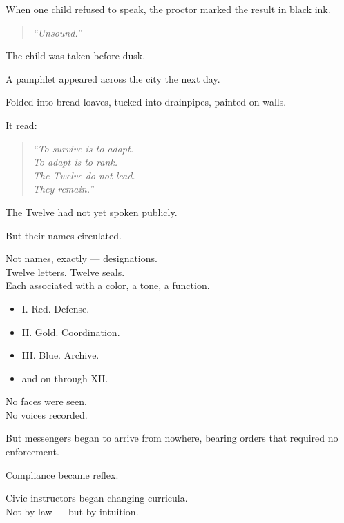\documentclass[9pt]{article}
\begin{document}
When one child refused to speak, the proctor marked the result in black ink.

\begin{quote}
\textit{“Unsound.”}
\end{quote}

The child was taken before dusk.

\vspace{1em}

A pamphlet appeared across the city the next day.

Folded into bread loaves, tucked into drainpipes, painted on walls.

It read:

\begin{quote}
\textit{“To survive is to adapt.}\\
\textit{To adapt is to rank.}\\
\textit{The Twelve do not lead.}\\
\textit{They remain.”}
\end{quote}

\vspace{1em}

The Twelve had not yet spoken publicly.

But their names circulated.

Not names, exactly — designations.\\
Twelve letters. Twelve seals.\\
Each associated with a color, a tone, a function.

\begin{itemize}
    \item I. Red. Defense.
    \item II. Gold. Coordination.
    \item III. Blue. Archive.
    \item \textellipsis{} and on through XII.
\end{itemize}

No faces were seen.\\
No voices recorded.

But messengers began to arrive from nowhere, bearing orders that required no enforcement.

Compliance became reflex.

\vspace{1em}

Civic instructors began changing curricula.\\
Not by law — but by intuition.
\end{document}
